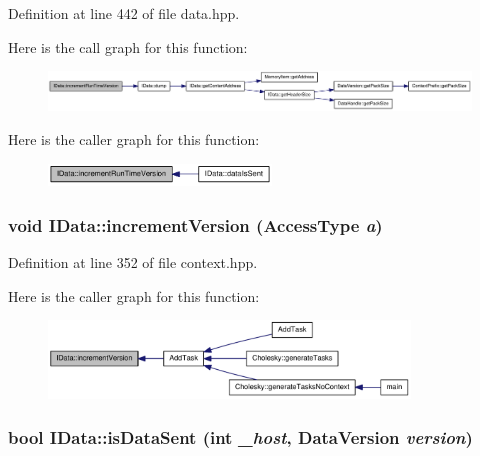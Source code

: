Definition at line 442 of file data.hpp.

Here is the call graph for this function:\nopagebreak
\begin{figure}[H]
\begin{center}
\leavevmode
\includegraphics[width=420pt]{class_i_data_af2d4e7dff291b828c12a41728ed74d4e_cgraph}
\end{center}
\end{figure}


Here is the caller graph for this function:\nopagebreak
\begin{figure}[H]
\begin{center}
\leavevmode
\includegraphics[width=168pt]{class_i_data_af2d4e7dff291b828c12a41728ed74d4e_icgraph}
\end{center}
\end{figure}
\hypertarget{class_i_data_a8593d60d0456b7904241d3a722db3acc}{
\subsubsection[{incrementVersion}]{\setlength{\rightskip}{0pt plus 5cm}void IData::incrementVersion ({\bf AccessType} {\em a})}}
\label{class_i_data_a8593d60d0456b7904241d3a722db3acc}


Definition at line 352 of file context.hpp.

Here is the caller graph for this function:\nopagebreak
\begin{figure}[H]
\begin{center}
\leavevmode
\includegraphics[width=272pt]{class_i_data_a8593d60d0456b7904241d3a722db3acc_icgraph}
\end{center}
\end{figure}
\hypertarget{class_i_data_a37f03e8f2b04b4f54c6b5768f52c0845}{
\subsubsection[{isDataSent}]{\setlength{\rightskip}{0pt plus 5cm}bool IData::isDataSent (int {\em \_\-host}, \/  {\bf DataVersion} {\em version})}}
\label{class_i_data_a37f03e8f2b04b4f54c6b5768f52c0845}



